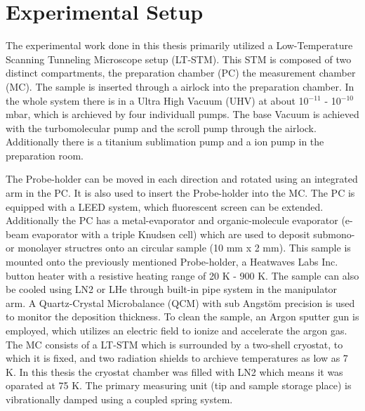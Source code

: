 \chapter{Experimental Setup}
\label{sec:versuchsandordnung}
The experimental work done in this thesis primarily utilized a Low-Temperature Scanning Tunneling Microscope setup (LT-STM).
This STM is composed of two distinct compartments, the preparation chamber (PC) the measurement chamber (MC).
The sample is inserted through a airlock into the preparation chamber.
In the whole system there is in a Ultra High Vacuum (UHV) at about 10$^{-11}$ - 10$^{-10}$ mbar, which is archieved by four individuall pumps.
The base Vacuum is achieved with the turbomolecular pump and the scroll pump through the airlock.
Additionally there is a titanium sublimation pump and a ion pump in the preparation room.


The Probe-holder can be moved in each direction and rotated using an integrated arm in the PC.
It is also used to insert the Probe-holder into the MC.
The PC is equipped with a LEED system, which fluorescent screen can be extended. 
Additionally the PC has a metal-evaporator and organic-molecule evaporator (e-beam evaporator with a triple Knudsen cell) which are used to deposit submono- or monolayer structres onto an circular sample (10 mm x 2 mm).
This sample is mounted onto the previously mentioned Probe-holder, a Heatwaves Labs Inc. button heater with a resistive heating range of 20 K - 900 K.
The sample can also be cooled using LN2 or LHe through built-in pipe system in the manipulator arm.
A Quartz-Crystal Microbalance (QCM) with sub Angstöm precision is used to monitor the deposition thickness.
To clean the sample, an Argon sputter gun is employed, which utilizes an electric field to ionize and accelerate the argon gas.
The MC consists of a LT-STM which is surrounded by a two-shell cryostat, to which it is fixed, and two radiation shields to archieve temperatures as low as 7 K.
In this thesis the cryostat chamber was filled with LN2 which means it was oparated at 75 K.
The primary measuring unit (tip and sample storage place) is vibrationally damped using a coupled spring system.
